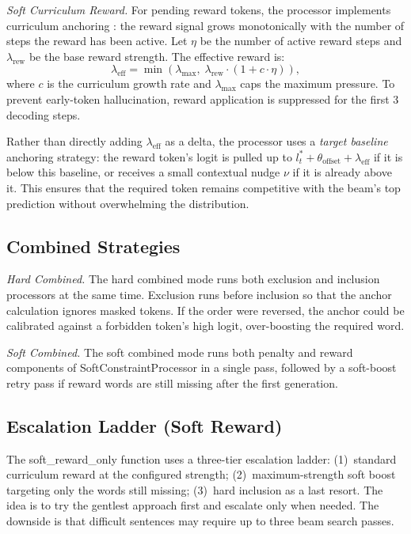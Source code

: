 \documentclass[conference]{IEEEtran}
\begin{document}
\emph{Soft Curriculum Reward.} For pending reward tokens, the processor implements curriculum anchoring \cite{bengio2009curriculum}: the reward signal grows monotonically with the number of steps the reward has been active. Let $\eta$ be the number of active reward steps and $\lambda_{\text{rew}}$ be the base reward strength. The effective reward is:
\begin{equation}
    \lambda_{\text{eff}} = \min\!\left(\lambda_{\text{max}},\; \lambda_{\text{rew}} \cdot (1 + c \cdot \eta)\right),
\end{equation}
where $c$ is the curriculum growth rate and $\lambda_{\text{max}}$ caps the maximum pressure. To prevent early-token hallucination, reward application is suppressed for the first 3 decoding steps.

Rather than directly adding $\lambda_{\text{eff}}$ as a delta, the processor uses a \emph{target baseline} anchoring strategy: the reward token's logit is pulled up to $l_t^{*} + \theta_{\text{offset}} + \lambda_{\text{eff}}$ if it is below this baseline, or receives a small contextual nudge $\nu$ if it is already above it. This ensures that the required token remains competitive with the beam's top prediction without overwhelming the distribution.

\subsection{Combined Strategies}

\emph{Hard Combined.} The hard combined mode runs both exclusion and inclusion processors at the same time. Exclusion runs before inclusion so that the anchor calculation ignores masked tokens. If the order were reversed, the anchor could be calibrated against a forbidden token's high logit, over-boosting the required word.

\emph{Soft Combined.} The soft combined mode runs both penalty and reward components of SoftConstraintProcessor in a single pass, followed by a soft-boost retry pass if reward words are still missing after the first generation.

\subsection{Escalation Ladder (Soft Reward)}

The soft\_reward\_only function uses a three-tier escalation ladder: (1)~standard curriculum reward at the configured strength; (2)~maximum-strength soft boost targeting only the words still missing; (3)~hard inclusion as a last resort. The idea is to try the gentlest approach first and escalate only when needed. The downside is that difficult sentences may require up to three beam search passes.
\end{document}

